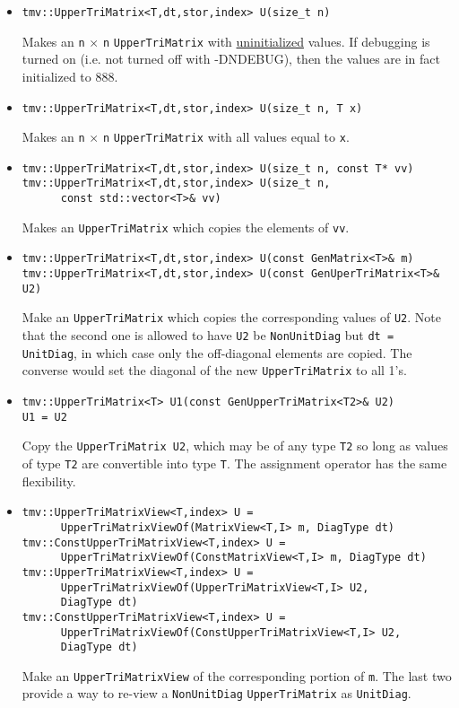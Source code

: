\documentclass[twoside,letterpaper,11pt]{article}
\renewcommand{\tt}[1]{{\texttt {#1}}}
\begin{document}
\begin{itemize}
\item 
\begin{verbatim}
tmv::UpperTriMatrix<T,dt,stor,index> U(size_t n)
\end{verbatim}
Makes an \tt{n} $\times$ \tt{n} \tt{UpperTriMatrix} with \underline{uninitialized} values.
If debugging is turned on (i.e. not turned off
with -DNDEBUG), then the values are in fact initialized to 888.  

\item
\begin{verbatim}
tmv::UpperTriMatrix<T,dt,stor,index> U(size_t n, T x)
\end{verbatim}
Makes an \tt{n} $\times$ \tt{n} \tt{UpperTriMatrix} with all values equal to \tt{x}.

\item
\begin{verbatim}
tmv::UpperTriMatrix<T,dt,stor,index> U(size_t n, const T* vv)
tmv::UpperTriMatrix<T,dt,stor,index> U(size_t n, 
      const std::vector<T>& vv)
\end{verbatim}
Makes an \tt{UpperTriMatrix} which copies the elements of \tt{vv}.

\item 
\begin{verbatim}
tmv::UpperTriMatrix<T,dt,stor,index> U(const GenMatrix<T>& m)
tmv::UpperTriMatrix<T,dt,stor,index> U(const GenUperTriMatrix<T>& U2)
\end{verbatim}
Make an \tt{UpperTriMatrix} which copies the corresponding values of
\tt{U2}.  Note that the second one is allowed to have \tt{U2} be
\tt{NonUnitDiag} but \tt{dt = UnitDiag}, in which case only the 
off-diagonal elements are copied.  The converse would set the 
diagonal of the new \tt{UpperTriMatrix} to all 1's.

\item
\begin{verbatim}
tmv::UpperTriMatrix<T> U1(const GenUpperTriMatrix<T2>& U2)
U1 = U2
\end{verbatim}
Copy the \tt{UpperTriMatrix U2}, which may be of any type \tt{T2} so long
as values of type \tt{T2} are convertible into type \tt{T}.
The assignment operator has the same flexibility.

\item
\begin{verbatim}
tmv::UpperTriMatrixView<T,index> U = 
      UpperTriMatrixViewOf(MatrixView<T,I> m, DiagType dt)
tmv::ConstUpperTriMatrixView<T,index> U = 
      UpperTriMatrixViewOf(ConstMatrixView<T,I> m, DiagType dt)
tmv::UpperTriMatrixView<T,index> U = 
      UpperTriMatrixViewOf(UpperTriMatrixView<T,I> U2,
      DiagType dt)
tmv::ConstUpperTriMatrixView<T,index> U = 
      UpperTriMatrixViewOf(ConstUpperTriMatrixView<T,I> U2, 
      DiagType dt)
\end{verbatim}
Make an \tt{UpperTriMatrixView} of the corresponding portion of \tt{m}. 
The last two provide a way to re-view a 
\tt{NonUnitDiag} \tt{UpperTriMatrix} as \tt{UnitDiag}.


\end{itemize}
\end{document}
